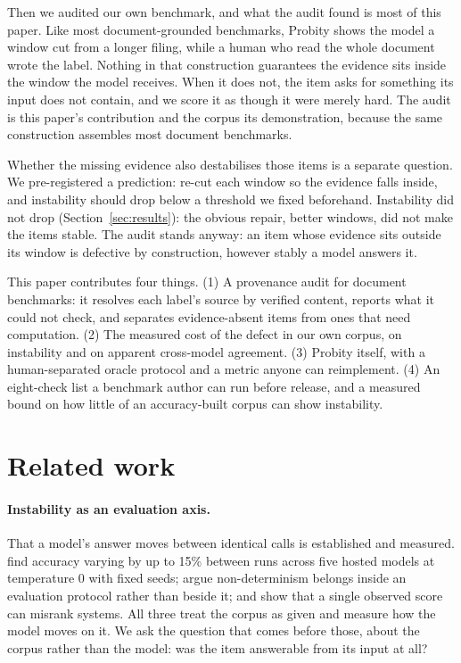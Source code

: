 \documentclass[11pt]{article}
\begin{document}
Then we audited our own benchmark, and what the audit found is most of this paper. Like most
document-grounded benchmarks, Probity shows the model a window cut from a longer filing, while a
human who read the whole document wrote the label. Nothing in that construction guarantees the
evidence sits inside the window the model receives. When it does not, the item asks for something
its input does not contain, and we score it as though it were merely hard. The audit is this
paper's contribution and the corpus its demonstration, because the same construction assembles
most document benchmarks.

Whether the missing evidence also destabilises those items is a separate question. We
pre-registered a prediction: re-cut each window so the evidence falls inside, and instability
should drop below a threshold we fixed beforehand. Instability did not drop
(Section~\ref{sec:results}): the obvious repair, better windows, did not make the items stable.
The audit stands anyway: an item whose evidence sits outside its window is defective by
construction, however stably a model answers it.

This paper contributes four things. (1) A provenance audit for document benchmarks: it resolves
each label's source by verified content, reports what it could not check, and separates
evidence-absent items from ones that need computation. (2) The measured cost of the defect in our
own corpus, on instability and on apparent cross-model agreement. (3) Probity itself, with a
human-separated oracle protocol and a metric anyone can reimplement. (4) An eight-check list a
benchmark author can run before release, and a measured bound on how little of an accuracy-built
corpus can show instability.

\section{Related work}
\label{sec:related}

\paragraph{Instability as an evaluation axis.} That a model's answer moves between identical calls
is established and measured. \citet{atil-etal-2025-non} find accuracy varying by up to 15\% between
runs across five hosted models at temperature 0 with fixed seeds; \citet{song-etal-2025-good} argue
non-determinism belongs inside an evaluation protocol rather than beside it; and
\citet{potamitis-etal-2025-reasonbench} show that a single observed score can misrank systems. All
three treat the corpus as given and measure how the model moves on it. We ask the question that
comes before those, about the corpus rather than the model: was the item answerable from its input
at all?
\end{document}
